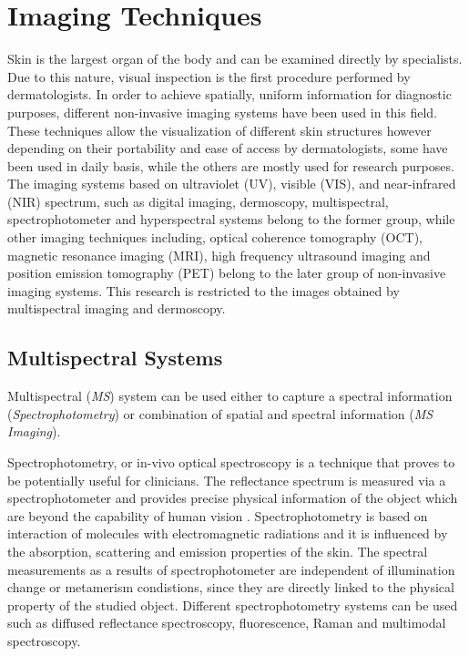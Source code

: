 	\section{Imaging Techniques}
	Skin is the largest organ of the body and can be examined directly by specialists. Due to this nature, visual inspection is the first procedure performed by dermatologists. In order to achieve spatially, uniform information for diagnostic purposes, different non-invasive imaging systems have been used in this field. These techniques allow the visualization of different skin structures however depending on their portability and ease of access by dermatologists, some have been used in daily basis, while the others are mostly used for research purposes. 
	The imaging systems based on ultraviolet (UV), visible (VIS), and near-infrared (NIR) spectrum, such as digital imaging, dermoscopy, multispectral, spectrophotometer and hyperspectral systems belong to the former group, while other imaging techniques including, optical coherence tomography (OCT), magnetic resonance imaging (MRI), high frequency ultrasound imaging and position emission tomography (PET) belong to the later group of non-invasive imaging systems. 
	This research is restricted to the images obtained by multispectral imaging and dermoscopy.
	
	\subsection{Multispectral Systems}
	Multispectral (\textit{MS}) system can be used either to capture a spectral information (\textit{Spectrophotometry}) or combination of spatial and spectral information (\textit{MS Imaging}). 
	
	Spectrophotometry, or in-vivo optical spectroscopy is a technique that proves to be potentially useful for clinicians. The reflectance spectrum is measured via a spectrophotometer and provides precise physical information of the object which are beyond the capability of human vision \cite{jolivot2011developpement}. Spectrophotometry is based on interaction of molecules with electromagnetic radiations and it is influenced by the absorption, scattering and emission properties of the skin. The spectral measurements as a results of spectrophotometer are independent of illumination change or metamerism condistions, since they are directly linked to the physical property of the studied object. Different spectrophotometry systems can be used such as diffused reflectance spectroscopy, fluorescence, Raman and multimodal spectroscopy.\\
	
